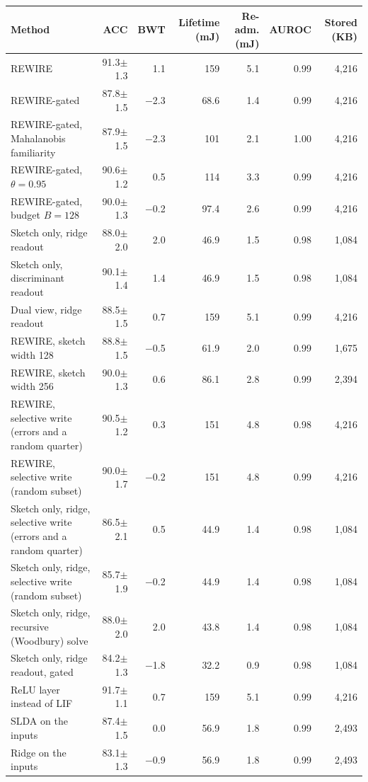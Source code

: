 \begin{tabular*}{\textwidth}{@{\extracolsep{\fill}}lrrrrrr@{}}
\toprule
Method & ACC & BWT & Lifetime (mJ) & Re-adm. (mJ) & AUROC & Stored (KB) \\
\midrule
REWIRE & 91.3$\pm$1.3 & 1.1 & 159 & 5.1 & 0.99 & 4,216 \\
REWIRE-gated & 87.8$\pm$1.5 & \ensuremath{-}2.3 & 68.6 & 1.4 & 0.99 & 4,216 \\
REWIRE-gated, Mahalanobis familiarity & 87.9$\pm$1.5 & \ensuremath{-}2.3 & 101 & 2.1 & 1.00 & 4,216 \\
REWIRE-gated, $\theta=0.95$ & 90.6$\pm$1.2 & 0.5 & 114 & 3.3 & 0.99 & 4,216 \\
REWIRE-gated, budget $B=128$ & 90.0$\pm$1.3 & \ensuremath{-}0.2 & 97.4 & 2.6 & 0.99 & 4,216 \\
Sketch only, ridge readout & 88.0$\pm$2.0 & 2.0 & 46.9 & 1.5 & 0.98 & 1,084 \\
Sketch only, discriminant readout & 90.1$\pm$1.4 & 1.4 & 46.9 & 1.5 & 0.98 & 1,084 \\
Dual view, ridge readout & 88.5$\pm$1.5 & 0.7 & 159 & 5.1 & 0.99 & 4,216 \\
REWIRE, sketch width 128 & 88.8$\pm$1.5 & \ensuremath{-}0.5 & 61.9 & 2.0 & 0.99 & 1,675 \\
REWIRE, sketch width 256 & 90.0$\pm$1.3 & 0.6 & 86.1 & 2.8 & 0.99 & 2,394 \\
REWIRE, selective write (errors and a random quarter) & 90.5$\pm$1.2 & 0.3 & 151 & 4.8 & 0.98 & 4,216 \\
REWIRE, selective write (random subset) & 90.0$\pm$1.7 & \ensuremath{-}0.2 & 151 & 4.8 & 0.99 & 4,216 \\
Sketch only, ridge, selective write (errors and a random quarter) & 86.5$\pm$2.1 & 0.5 & 44.9 & 1.4 & 0.98 & 1,084 \\
Sketch only, ridge, selective write (random subset) & 85.7$\pm$1.9 & \ensuremath{-}0.2 & 44.9 & 1.4 & 0.98 & 1,084 \\
Sketch only, ridge, recursive (Woodbury) solve & 88.0$\pm$2.0 & 2.0 & 43.8 & 1.4 & 0.98 & 1,084 \\
Sketch only, ridge readout, gated & 84.2$\pm$1.3 & \ensuremath{-}1.8 & 32.2 & 0.9 & 0.98 & 1,084 \\
ReLU layer instead of LIF & 91.7$\pm$1.1 & 0.7 & 159 & 5.1 & 0.99 & 4,216 \\
SLDA on the inputs & 87.4$\pm$1.5 & 0.0 & 56.9 & 1.8 & 0.99 & 2,493 \\
Ridge on the inputs & 83.1$\pm$1.3 & \ensuremath{-}0.9 & 56.9 & 1.8 & 0.99 & 2,493 \\

\end{tabular*}
